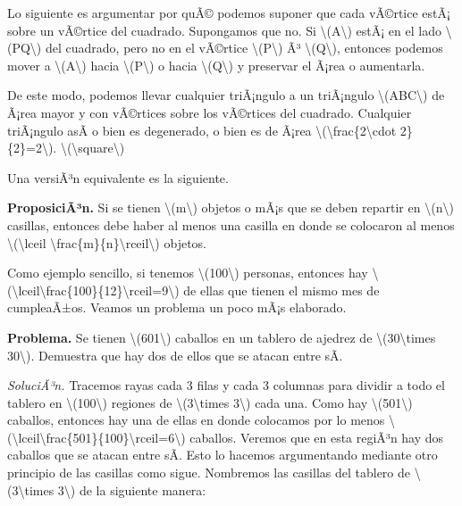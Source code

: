 \documentclass[
]{article}
\makeatletter
\newcommand*\pandocbounded[1]{%
  \sbox\pandoc@box{#1}%
  \Gscale@div\@tempa{\textheight}{\dimexpr\ht\pandoc@box+\dp\pandoc@box\relax}%
  \Gscale@div\@tempb{\linewidth}{\wd\pandoc@box}%
  \ifdim\@tempb\p@<\@tempa\p@\let\@tempa\@tempb\fi%
  \ifdim\@tempa\p@<\p@\scalebox{\@tempa}{\usebox\pandoc@box}%
  \else\usebox{\pandoc@box}%
  \fi%
}
\makeatother
\begin{document}
\pandocbounded{}

Lo siguiente es argumentar por quÃ© podemos suponer que cada vÃ©rtice
estÃ¡ sobre un vÃ©rtice del cuadrado. Supongamos que no. Si
{\textbackslash(A\textbackslash)} estÃ¡ en el lado
{\textbackslash(PQ\textbackslash)} del cuadrado, pero no en el vÃ©rtice
{\textbackslash(P\textbackslash)} Ã³ {\textbackslash(Q\textbackslash)},
entonces podemos mover a {\textbackslash(A\textbackslash)} hacia
{\textbackslash(P\textbackslash)} o hacia
{\textbackslash(Q\textbackslash)} y preservar el Ã¡rea o aumentarla.

\pandocbounded{}

De este modo, podemos llevar cualquier triÃ¡ngulo a un triÃ¡ngulo
{\textbackslash(ABC\textbackslash)} de Ã¡rea mayor y con vÃ©rtices sobre
los vÃ©rtices del cuadrado. Cualquier triÃ¡ngulo asÃ­ o bien es
degenerado, o bien es de Ã¡rea
{\textbackslash(\textbackslash frac\{2\textbackslash cdot
2\}\{2\}=2\textbackslash)}.
{{\textbackslash(\textbackslash square\textbackslash)}}

Una versiÃ³n equivalente es la siguiente.

\textbf{ProposiciÃ³n.} Si se tienen {\textbackslash(m\textbackslash)}
objetos o mÃ¡s que se deben repartir en
{\textbackslash(n\textbackslash)} casillas, entonces debe haber al menos
una casilla en donde se colocaron al menos
{\textbackslash(\textbackslash lceil
\textbackslash frac\{m\}\{n\}\textbackslash rceil\textbackslash)}
objetos.

Como ejemplo sencillo, si tenemos {\textbackslash(100\textbackslash)}
personas, entonces hay
{\textbackslash(\textbackslash lceil\textbackslash frac\{100\}\{12\}\textbackslash rceil=9\textbackslash)}
de ellas que tienen el mismo mes de cumpleaÃ±os. Veamos un problema un
poco mÃ¡s elaborado.

\textbf{Problema.} Se tienen {\textbackslash(601\textbackslash)}
caballos en un tablero de ajedrez de
{\textbackslash(30\textbackslash times 30\textbackslash)}. Demuestra que
hay dos de ellos que se atacan entre sÃ­.

\emph{SoluciÃ³n.} Tracemos rayas cada 3 filas y cada 3 columnas para
dividir a todo el tablero en {\textbackslash(100\textbackslash)}
regiones de {\textbackslash(3\textbackslash times 3\textbackslash)} cada
una. Como hay {\textbackslash(501\textbackslash)} caballos, entonces hay
una de ellas en donde colocamos por lo menos
{\textbackslash(\textbackslash lceil\textbackslash frac\{501\}\{100\}\textbackslash rceil=6\textbackslash)}
caballos. Veremos que en esta regiÃ³n hay dos caballos que se atacan
entre sÃ­. Esto lo hacemos argumentando mediante otro principio de las
casillas como sigue. Nombremos las casillas del tablero de
{\textbackslash(3\textbackslash times 3\textbackslash)} de la siguiente
manera:
\end{document}
